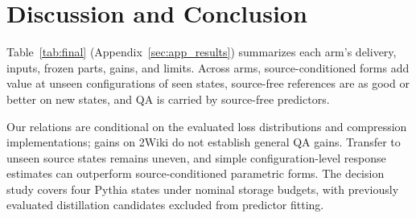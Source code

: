 \section{Discussion and Conclusion}
\label{sec:discussion}

Table~\ref{tab:final} (Appendix~\ref{sec:app_results}) summarizes each arm's delivery, inputs, frozen parts, gains, and limits. Across arms, source-conditioned forms add value at unseen configurations of seen states, source-free references are as good or better on new states, and QA is carried by source-free predictors.

Our relations are conditional on the evaluated loss distributions and
compression implementations; gains on 2Wiki do not establish general QA gains. Transfer to unseen source
states remains uneven, and simple configuration-level response
estimates can outperform source-conditioned parametric forms. The decision study covers four Pythia states under nominal storage budgets, with previously evaluated distillation candidates excluded from predictor fitting.
